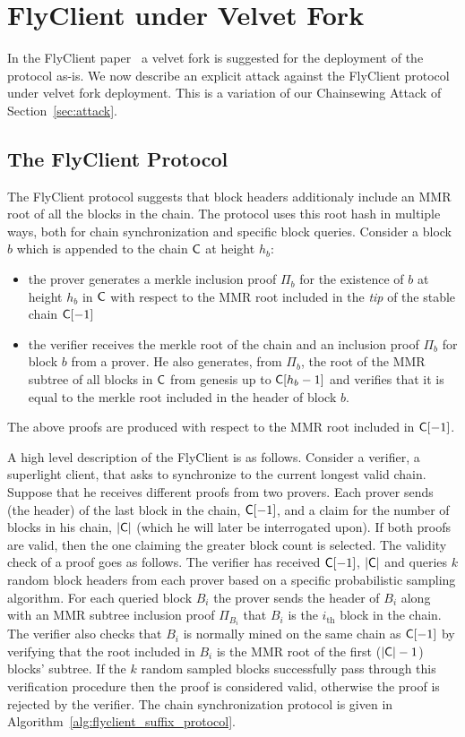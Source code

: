 \section{FlyClient under Velvet Fork}
\label{sec:flyclient}
In the FlyClient paper~\cite{flyclient} a velvet fork is suggested for the deployment of the protocol as-is.
We now describe an explicit attack against
the FlyClient protocol under velvet fork deployment.
This is a variation of our Chainsewing Attack of Section~\ref{sec:attack}.

\subsection{The FlyClient Protocol}
	The FlyClient protocol suggests that block headers additionaly include an MMR root of all the blocks in the chain. The protocol uses this root hash in multiple ways, both for chain synchronization and specific block queries. Consider a block $b$ which is appended to the chain $\mathsf{C}$ at height $h_b$:
	\begin{itemize}
		\item the prover generates a merkle inclusion proof $\Pi_b$ for the existence of $b$ at height $h_b$ in $\mathsf{C}$ with respect to the MMR root included in the \emph{tip} of the stable chain $\mathsf{C}[-1]$
		\item the verifier receives the merkle root of the chain and an inclusion proof $\Pi_b$ for block $b$ from a prover. He also generates, from $\Pi_b$, the root of the MMR subtree of all blocks in $\mathsf{C}$ from genesis up to $\mathsf{C}[h_b - 1]$ and verifies that it is equal to the merkle root included in the header of block $b$.
	\end{itemize}
	The above proofs are produced with respect to the MMR root included in $\mathsf{C}[-1]$.

	\vspace{2mm}
	\noindent
	A high level description of the FlyClient is as follows. Consider a verifier, a superlight client, that asks to synchronize to the current longest valid chain. Suppose that he receives different proofs from two provers. Each prover sends (the header) of the last block in the chain, $\mathsf{C}[-1]$, and a claim for the number of blocks in his chain, $\lvert \mathsf{C} \rvert$ (which he will later be interrogated upon). If both proofs are valid, then the one claiming the greater block count is selected. The validity check of a proof goes as follows.
	The verifier has received $\mathsf{C}[-1]$, $\lvert \mathsf{C} \rvert$ and queries $k$ random block headers from each prover based on a specific probabilistic sampling algorithm. For each queried block $B_i$ the prover sends the header of $B_i$ along with an MMR subtree inclusion proof $\Pi_{B_i}$ that $B_i$ is the $i_\text{th}$ block in the chain. The verifier also checks that $B_i$ is normally mined on the same chain as $\mathsf{C}[-1]$ by verifying that the root included in $B_i$ is the MMR root of the first ($\lvert \mathsf{C} \rvert - 1$) blocks' subtree. If the $k$ random sampled blocks successfully pass through this verification procedure then the proof is considered valid, otherwise the proof is rejected by the verifier.
	The chain synchronization protocol is given in Algorithm~\ref{alg:flyclient_suffix_protocol}.


